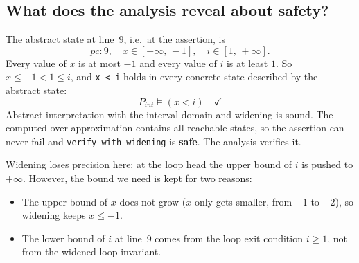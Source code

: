 \documentclass[11pt,a4paper]{article}
\newenvironment{fitbox}
  {\begin{lrbox}{\fitboxcontent}}
  {\end{lrbox}%
   \ifdim\wd\fitboxcontent>\linewidth
     \resizebox{\linewidth}{!}{\usebox{\fitboxcontent}}%
   \else
     \usebox{\fitboxcontent}%
   \fi}
\newcommand{\itv}[2]{[#1,\,#2]}
\newcommand{\ninf}{-\infty}
\newcommand{\pinf}{+\infty}
\begin{document}
\begin{center}
\begin{fitbox}
\end{fitbox}
\end{center}

\subsection*{What does the analysis reveal about safety?}

The abstract state at line~9, i.e.\ at the assertion, is
\[
  \mathit{pc}\colon 9,\quad x \in \itv{\ninf}{-1},\quad i \in \itv{1}{\pinf}.
\]
Every value of $x$ is at most $-1$ and every value of $i$ is at least $1$. So
$x \le -1 < 1 \le i$, and \texttt{x < i} holds in every concrete state described by the
abstract state:
\[
  P_{\mathit{int}} \models (x < i) \quad \checkmark
\]
Abstract interpretation with the interval domain and widening is sound. The computed
over-approximation contains all reachable states, so the assertion can never fail and
\texttt{verify\_with\_widening} is \textbf{safe}. The analysis verifies it.

Widening loses precision here: at the loop head the upper bound of $i$ is pushed to
$\pinf$. However, the bound we need is kept for two reasons:
\begin{itemize}
  \item The upper bound of $x$ does not grow ($x$ only gets smaller, from $-1$ to $-2$),
        so widening keeps $x \le -1$.
  \item The lower bound of $i$ at line~9 comes from the loop exit condition $i \ge 1$, not
        from the widened loop invariant.
\end{itemize}
\end{document}
